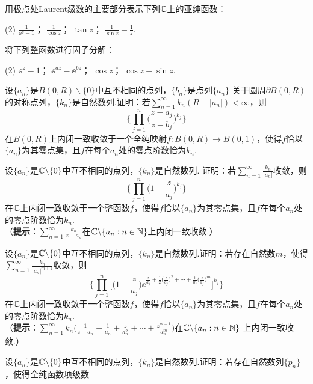 \begin{xiti}
  \item 用极点处Laurent级数的主要部分表示下列$\mathbb C$上的亚纯函数：
    \begin{tasks}(2)
      \task $\frac1{\ee^z-1}$；
      \task $\frac1{\cos z}$；
      \task $\tan z$；
      \task $\frac1{\sin z}-\frac1z$.
    \end{tasks}
  \item 将下列整函数进行因子分解：
    \begin{tasks}(2)
      \task $\ee^z-1$；
      \task $\ee^{az}-\ee^{bz}$；
      \task $\cos z$；
      \task $\cos z-\sin z$.
    \end{tasks}
  \item 设$\{a_n\}$是$B(0,R)\backslash\{0\}$中互不相同的点列，$\{b_n\}$是点列$\{a_n\}$
    关于圆周$\partial B(0,R)$的对称点列，$\{k_n\}$是自然数列.证明：若$\sum_{n=1}^\infty k_n(R-|a_n|)<\infty$，则
    \[
      \bigg\{\prod_{j=1}^n \bigg(\frac{z-a_j}{z-b_j} \bigg)^{k_j}\bigg\}
    \]
    在$B(0,R)$上内闭一致收敛于一个全纯映射$f:B(0,R)\to B(0,1)$，使得$f$恰以$\{a_n\}$为其零点集，且$f$在每个$a_n$处的零点阶数恰为$k_n$.
  \item 设$\{a_n\}$是$\mathbb C\backslash\{0\}$中互不相同的点列，$\{k_n\}$是自然数列. 证明：若$\sum_{n=1}^\infty\frac{k_n}{|a_n|}$收敛，则
      \[
        \bigg\{\prod_{j=1}^n\bigg(1-\frac z{a_j}\bigg)^{k_j}\bigg\}
      \]
      在$\mathbb C$上内闭一致收敛于一个整函数$f$，使得$f$恰以$\{a_n\}$为其零点集，且$f$在每个$a_n$处的零点阶数恰为$k_n$.\\
     （\textbf{提示}：$\sum_{n=1}^\infty\frac{k_n}{z-a_n}$在$\mathbb C\backslash\{a_n:n\in\mathbb N\}$上内闭一致收敛.）
  \item 设$\{a_n\}$是$\mathbb C\backslash\{0\}$中互不相同的点列，$\{k_n\}$是自然数列.证明：若存在自然数$m$，使得$\sum_{n=1}^\infty\frac{k_n}{|a_n|^{m+1}}$收敛，则
      \[
        \bigg\{\prod_{j=1}^n\bigg[\bigg(1-\frac z{a_j}\bigg)\ee^{\frac z{a_j} + \frac12\big(\frac z{a_j}\big)^2 + \cdots + \frac1m\big(\frac z{a_j}\big)^m}\bigg]^{k_j}\bigg\}
      \]
      在$\mathbb C$上内闭一致收敛于一个整函数$f$，使得$f$恰以$\{a_n\}$为其零点集，且$f$在每个$a_n$处的零点阶数恰为$k_n$.\\
      （\textbf{提示}：$\sum_{n=1}^\infty k_n\bigg(\frac1{z-a_n}+\frac1{a_n}
      +\frac z{a_n^2}+\cdots+\frac{z^{m-1}}{a_n^m}\bigg)$在$\mathbb C\backslash\{a_n:n\in\mathbb N\}$
      上内闭一致收敛.）
  \item 设$\{a_n\}$是$\mathbb C\backslash\{0\}$中互不相同的点列，$\{k_n\}$是自然数列.证明：若存在自然数列$\{p_n\}$，使得全纯函数项级数
      \[
\]
\end{xiti}
